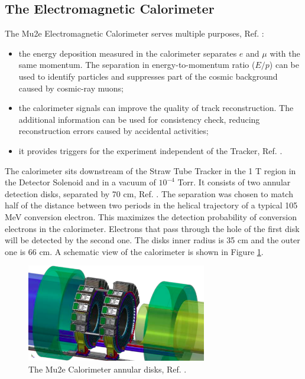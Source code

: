 \subsection{The Electromagnetic Calorimeter}\label{calorimeter}
The Mu2e Electromagnetic Calorimeter serves multiple purposes, Ref. \cite{em4}:
\begin{itemize}
    \item the energy deposition measured in the calorimeter separates $e$ and $\mu$ with the same momentum.
    The separation in energy-to-momentum ratio ($E/p$) can be used to identify particles and suppresses
    part of the cosmic background caused by cosmic-ray muons;
    \item the calorimeter signals can improve the quality of track reconstruction. The additional information can
    be used for consistency check, reducing reconstruction errors caused by accidental activities;
    \item it provides triggers for the experiment independent of the Tracker, Ref. \cite{em6}. 
\end{itemize} 
The calorimeter sits downstream of the Straw Tube Tracker in the 1 T region in the Detector Solenoid and in a vacuum of $10^{-4}$ Torr. 
It consists of two annular detection disks, separated by 70 cm, Ref. \cite{em7}. 
The separation was chosen to match half of the distance between two periods in the helical trajectory of a
typical 105 MeV conversion electron. This maximizes the detection probability of conversion electrons in the
calorimeter. Electrons that pass through the hole of the first disk will be detected by the second one.
The disks inner radius is 35 cm and the outer one is 66 cm. A schematic view of the calorimeter is shown in Figure \ref{fig:calo1}.
\begin{figure}[!h]
    \centering
    \includegraphics[width =0.7\textwidth]{figures/png/Screenshot_20240322_122050.png}
    \caption{The Mu2e Calorimeter annular disks, Ref. \cite{em7}.}
    \label{fig:calo1}
\end{figure}
